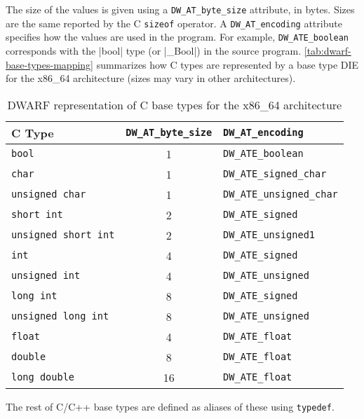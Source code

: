 The size of the values is given using a \verb|DW_AT_byte_size| attribute,
in bytes. Sizes are the same reported by the C \texttt{sizeof}
operator. A \verb|DW_AT_encoding| attribute specifies how the values are
used in the program. For example, \verb|DW_ATE_boolean|
corresponds with the \Mc|bool| type (or \Mc|_Bool|) in the
source program. \autoref{tab:dwarf-base-types-mapping} summarizes how C
types are represented by a base type DIE for the x86\_64 architecture
(sizes may vary in other architectures).

\begin{table}[ht]
	\begin{center}
		\begin{tabular}{lcl}
			\toprule
			C Type & \verb|DW_AT_byte_size| & \verb|DW_AT_encoding| \\
			\midrule
			\texttt{bool}               & 1 & \verb|DW_ATE_boolean| \\
			\texttt{char}               & 1 & \verb|DW_ATE_signed_char| \\
			\texttt{unsigned char}      & 1 & \verb|DW_ATE_unsigned_char| \\
			\texttt{short int}          & 2 & \verb|DW_ATE_signed| \\
			\texttt{unsigned short int} & 2 & \verb|DW_ATE_unsigned1| \\
			\texttt{int}                & 4 & \verb|DW_ATE_signed| \\
			\texttt{unsigned int}       & 4 & \verb|DW_ATE_unsigned| \\
			\texttt{long int}           & 8 & \verb|DW_ATE_signed| \\
			\texttt{unsigned long int}  & 8 & \verb|DW_ATE_unsigned| \\
			\texttt{float}              & 4 & \verb|DW_ATE_float| \\
			\texttt{double}             & 8 & \verb|DW_ATE_float| \\
			\texttt{long double}        & 16& \verb|DW_ATE_float| \\
			\bottomrule
		\end{tabular}
	\end{center}
	\caption{DWARF representation of C base types for the x86\_64 architecture}
	\label{tab:dwarf-base-types-mapping}
\end{table}

The rest of C/C++ base types are defined as aliases of these
using \texttt{typedef}.


